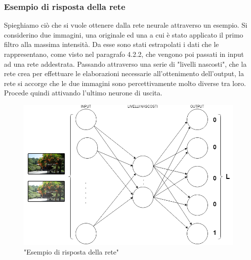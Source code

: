 \documentclass[a4paper,11pt]{article}
\begin{document}
    \subsubsection{Esempio di risposta della rete}
    Spieghiamo ciò che si vuole ottenere dalla rete neurale attraverso un esempio. Si considerino due immagini, una originale ed una a cui è stato applicato il primo filtro alla massima intensità.
    Da esse sono stati estrapolati i dati che le rappresentano, come visto nel paragrafo 4.2.2, che vengono poi passati in input ad una rete addestrata.
    Passando attraverso una serie di "livelli nascosti", che la rete crea per effettuare le elaborazioni necessarie all'ottenimento dell'output,
    la rete si accorge che le due immagini sono percettivamente molto diverse tra loro. Procede quindi attivando l'ultimo neurone di uscita.
    \begin{figure}[h]
        \centering
        \includegraphics[scale=0.4]{reteneurale}
        \caption{"Esempio di risposta della rete"}
    \end{figure}

    \newpage
\end{document}
